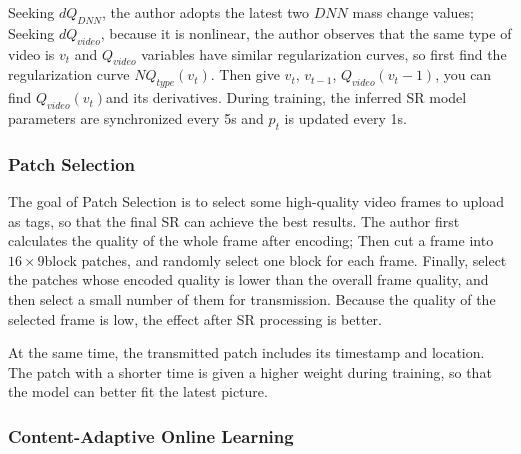 \documentclass[conference]{IEEEtran}
\begin{document}
Seeking $dQ_{DNN}$, the author adopts the latest two $DNN$ mass change values; Seeking $dQ_{video}$, because it is nonlinear, the author observes that the same type of video is $v_t$ and $Q_{video}$ variables have similar regularization curves, so first find the regularization curve $NQ_{type}(v_t)$. Then give $v_t$, $v_{t-1}$, $Q_{video}(v_t-1) $, you can find $Q_{video}(v_t)$and its derivatives. During training, the inferred SR model parameters are synchronized every 5s and $p_t$ is updated every 1s.

\subsubsection{Patch Selection}\quad

The goal of Patch Selection is to select some high-quality video frames to upload as tags, so that the final SR can achieve the best results. The author first calculates the quality of the whole frame after encoding; Then cut a frame into $16 \times9 $block patches, and randomly select one block for each frame. Finally, select the patches whose encoded quality is lower than the overall frame quality, and then select a small number of them for transmission. Because the quality of the selected frame is low, the effect after SR processing is better.

At the same time, the transmitted patch includes its timestamp and location. The patch with a shorter time is given a higher weight during training, so that the model can better fit the latest picture.

\subsubsection{Content-Adaptive Online Learning}\quad
\end{document}
